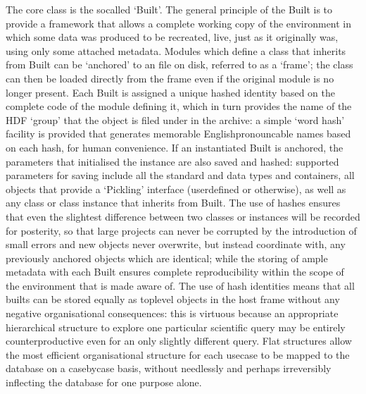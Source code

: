 \documentclass[letterpaper,10pt,english]{jupyterBook}
\begin{document}
\sphinxAtStartPar
The core  class is the so\sphinxhyphen{}called ‘Built’. The general principle of the Built is to provide a framework that allows a complete working copy of the environment in which some data was produced to be recreated, live, just as it originally was, using only some attached metadata. Modules which define a class that inherits from Built can be ‘anchored’ to an  file on disk, referred to as a ‘frame’; the class can then be loaded directly from the frame even if the original module is no longer present. Each Built is assigned a unique hashed identity based on the complete code of the module defining it, which in turn provides the name of the HDF ‘group’ that the object is filed under in the archive: a simple ‘word hash’ facility is provided that generates memorable English\sphinxhyphen{}pronouncable names based on each hash, for human convenience. If an instantiated Built is anchored, the parameters that initialised the instance are also saved and hashed: supported parameters for saving include all the standard  and  data types and containers, all objects that provide a ‘Pickling’ interface (user\sphinxhyphen{}defined or otherwise), as well as any class or class instance that inherits from Built. The use of hashes ensures that even the slightest difference between two classes or instances will be recorded for posterity, so that large projects can never be corrupted by the introduction of small errors and new objects never overwrite, but instead coordinate with, any previously anchored objects which are identical; while the storing of ample metadata with each Built ensures complete reproducibility within the scope of the environment that  is made aware of. The use of hash identities means that all builts can be stored equally as top\sphinxhyphen{}level objects in the host frame without any negative organisational consequences: this is virtuous because an appropriate hierarchical structure to explore one particular scientific query may be entirely counterproductive even for an only slightly different query. Flat structures allow the most efficient organisational structure for each use\sphinxhyphen{}case to be mapped to the database on a case\sphinxhyphen{}by\sphinxhyphen{}case basis, without needlessly and perhaps irreversibly inflecting the database for one purpose alone.
\end{document}
